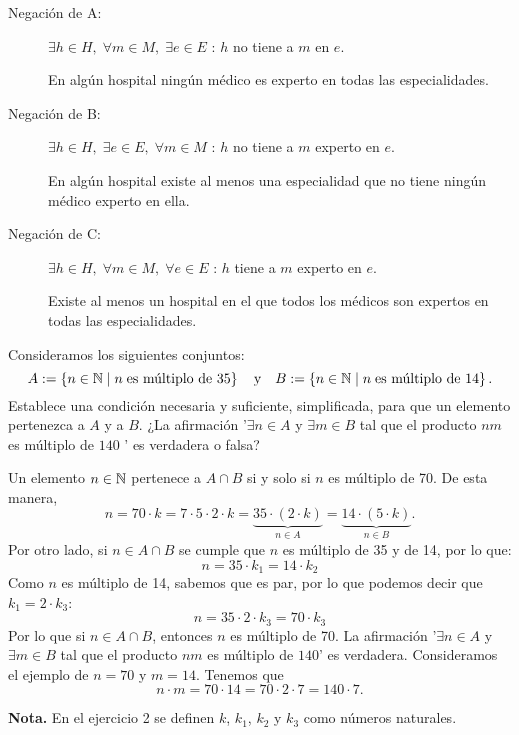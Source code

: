 \documentclass{article}
\begin{document}
\begin{sol}
\begin{description}
\item[Negación de A:] $\displaystyle \exists h \in H,\; \forall m \in M,\; \exists e\in E $ : $\displaystyle h $ no tiene a $\displaystyle m $ en $\displaystyle e $. 
\item[] En algún hospital ningún médico es experto en todas las especialidades. 
\item[Negación de B:] $\displaystyle \exists h \in H,\; \exists e \in E, \; \forall m \in M $ : $\displaystyle h $ no tiene a $\displaystyle m $ experto en $\displaystyle e $. 
\item[] En algún hospital existe al menos una especialidad que no tiene ningún médico experto en ella.
\item[Negación de C:] $\displaystyle \exists h \in H,\; \forall m \in M,\; \forall e \in E $ : $\displaystyle h $ tiene a $\displaystyle m $ experto en $\displaystyle e $. 
\item[] Existe al menos un hospital en el que todos los médicos son expertos en todas las especialidades.
\end{description}

\end{sol}


\begin{ej}
Consideramos los siguientes conjuntos:
\[A := \left\{n\in\mathbb{N} \; | \; n \;\text{es múltiplo de 35}\right\} \quad \text{y} \quad B:= \left\{n\in\mathbb{N}\; |\; n \; \text{es múltiplo de 14}\right\}.\]
Establece una condición necesaria y suficiente, simplificada, para que un elemento pertenezca a $\displaystyle A $ y a $\displaystyle B $. ¿La afirmación '$\displaystyle \exists n \in A $ y $\displaystyle \exists m\in B $ tal que el producto $\displaystyle nm $ es múltiplo de $\displaystyle 140 $ ' es verdadera o falsa?
\end{ej}

\begin{sol}
Un elemento $\displaystyle n \in \mathbb{N} $ pertenece a $\displaystyle A \cap \displaystyle B $ si y solo si $\displaystyle n $ es múltiplo de 70. De esta manera,
\[ n = 70\cdot k = 7\cdot 5\cdot 2 \cdot k = \underbrace{35 \cdot \left(2 \cdot k\right)}_{n \in A} = \underbrace{14 \cdot \left(5 \cdot k\right)}_{n \in B} .\]
Por otro lado, si $n \in A \cap B$ se cumple que $n$ es múltiplo de 35 y de 14, por lo que:
\[n = 35 \cdot k_1 = 14 \cdot k_2\]
Como $n$ es múltiplo de 14, sabemos que es par, por lo que podemos decir que $k_1 = 2 \cdot k_3$:
\[n = 35 \cdot 2\cdot k_3 = 70 \cdot k_3\]
Por lo que si $n\in A \cap B$, entonces $n$ es múltiplo de 70.
La afirmación '$\displaystyle \exists n \in A $ y $\displaystyle \exists m\in B $ tal que el producto $\displaystyle nm $ es múltiplo de $\displaystyle 140$' es verdadera. Consideramos el ejemplo de $\displaystyle n = 70 $ y $\displaystyle m = 14 $. Tenemos que 
\[n \cdot m = 70 \cdot 14 = 70 \cdot 2 \cdot 7 = 140 \cdot 7 .\]
\end{sol}
\textbf{Nota.} En el ejercicio 2 se definen $k$, $k_1$, $k_2$ y $k_3$ como números naturales. 
\end{document}
